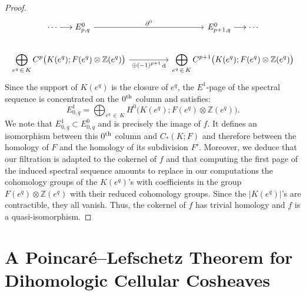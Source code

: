 \documentclass[AHL,Unicode,longabstracts,published]{cedram}
\newcommand{\Z}{\mathbb{Z}}
\DeclareMathOperator{\df}{d}
\begin{document}
\begin{proof}
\begin{equation*}
\begin{tikzcd}
\cdots \longrightarrow E^0_{p,q} \ar[rr,"\partial^0"] & & E^0_{p+1,q} \longrightarrow \cdots \\%
\displaystyle \bigoplus_{e^q\,\in\,K} C^p\big(K(e^q);F(e^q)\otimes\Z(e^q)\big) \ar[rr,"\oplus(-1)^{p+1}\df" below] & & \displaystyle \bigoplus_{e^q\,\in\,K} C^{p+1}\big(K(e^q);F(e^q)\otimes\Z(e^q)\big)
\end{tikzcd}
\end{equation*}
Since the support of $K(e^q)$ is the closure of $e^q$, the $E^1$-page of the spectral sequence is concentrated on the $0^{\rm th}$ column and satisfies:
\begin{equation*}
E^1_{0,q}=\bigoplus_{e^q\,\in\,K} H^0\big(K(e^q);F(e^q)\otimes\Z(e^q)\big).
\end{equation*}
We note that $E^1_{0,q}\subset E^0_{0,q}$ and is precisely the image of $f$. It defines an isomorphism between this $0^{\rm th}$ column and $C_*(K;F)$ and therefore between the homology of $F$ and the homology of its subdivision $F'$. Moreover, we deduce that our filtration is adapted to the cokernel of $f$ and that computing the first page of the induced spectral sequence amounts to replace in our computations the cohomology groups of the $K(e^q)$'s with coefficients in the group $F(e^q)\otimes\Z(e^q)$ with their reduced cohomology groups. Since the $|K(e^q)|$'s are contractible, they all vanish. Thus, the cokernel of $f$ has trivial homology and $f$ is a quasi-isomorphism.
\end{proof}

\section{A Poincaré--Lefschetz Theorem for Dihomologic Cellular Cosheaves}
\end{document}
